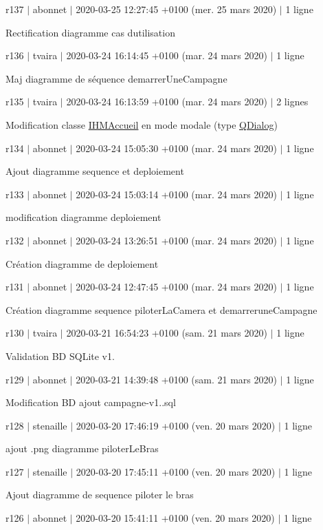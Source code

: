 r137 $\vert$ abonnet $\vert$ 2020-\/03-\/25 12\+:27\+:45 +0100 (mer. 25 mars 2020) $\vert$ 1 ligne

Rectification diagramme cas d\textquotesingle{}utilisation

r136 $\vert$ tvaira $\vert$ 2020-\/03-\/24 16\+:14\+:45 +0100 (mar. 24 mars 2020) $\vert$ 1 ligne

Maj diagramme de séquence demarrer\+Une\+Campagne

r135 $\vert$ tvaira $\vert$ 2020-\/03-\/24 16\+:13\+:59 +0100 (mar. 24 mars 2020) $\vert$ 2 lignes

Modification classe \hyperlink{class_i_h_m_accueil}{I\+H\+M\+Accueil} en mode modale (type \hyperlink{class_q_dialog}{Q\+Dialog})

r134 $\vert$ abonnet $\vert$ 2020-\/03-\/24 15\+:05\+:30 +0100 (mar. 24 mars 2020) $\vert$ 1 ligne

Ajout diagramme sequence et deploiement

r133 $\vert$ abonnet $\vert$ 2020-\/03-\/24 15\+:03\+:14 +0100 (mar. 24 mars 2020) $\vert$ 1 ligne

modification diagramme deploiement

r132 $\vert$ abonnet $\vert$ 2020-\/03-\/24 13\+:26\+:51 +0100 (mar. 24 mars 2020) $\vert$ 1 ligne

Création diagramme de deploiement

r131 $\vert$ abonnet $\vert$ 2020-\/03-\/24 12\+:47\+:45 +0100 (mar. 24 mars 2020) $\vert$ 1 ligne

Création diagramme sequence piloter\+La\+Camera et demarrerune\+Campagne

r130 $\vert$ tvaira $\vert$ 2020-\/03-\/21 16\+:54\+:23 +0100 (sam. 21 mars 2020) $\vert$ 1 ligne

Validation BD S\+Q\+Lite v1.

r129 $\vert$ abonnet $\vert$ 2020-\/03-\/21 14\+:39\+:48 +0100 (sam. 21 mars 2020) $\vert$ 1 ligne

Modification BD ajout campagne-\/v1..\+sql

r128 $\vert$ stenaille $\vert$ 2020-\/03-\/20 17\+:46\+:19 +0100 (ven. 20 mars 2020) $\vert$ 1 ligne

ajout .png diagramme piloter\+Le\+Bras

r127 $\vert$ stenaille $\vert$ 2020-\/03-\/20 17\+:45\+:11 +0100 (ven. 20 mars 2020) $\vert$ 1 ligne

Ajout diagramme de sequence piloter le bras

r126 $\vert$ abonnet $\vert$ 2020-\/03-\/20 15\+:41\+:11 +0100 (ven. 20 mars 2020) $\vert$ 1 ligne

